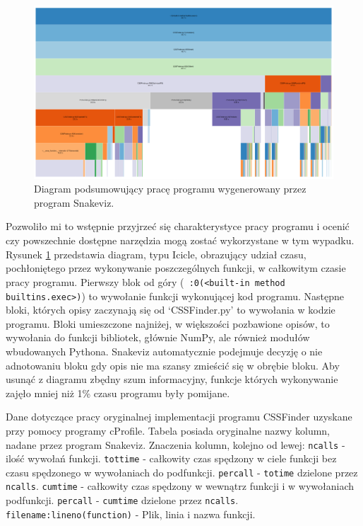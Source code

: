 \documentclass[11pt, a4paper]{article}
\newcommand{\code}[1]{\texttt{#1}}
\begin{document}
\begin{sloppypar}
    \FloatBarrier
    \begin{figure}[ht]
      \centering
      \includegraphics[width=1.0\textwidth]{"resources/profiling_1/graph.png"}
      \caption{Diagram podsumowujący pracę programu wygenerowany przez program Snakeviz.}
      \label{pre-prof-perf}
    \end{figure}
    \FloatBarrier

    Pozwoliło mi to wstępnie przyjrzeć się charakterystyce pracy programu i ocenić czy powszechnie
    dostępne narzędzia mogą zostać wykorzystane w tym wypadku. Rysunek
    \ref{pre-prof-perf} przedstawia diagram, typu Icicle, obrazujący udział czasu, pochłoniętego
    przez wykonywanie poszczególnych funkcji, w całkowitym czasie pracy programu. Pierwszy
    blok od góry (\code{~:0(<built-in method builtins.exec>)}) to wywołanie funkcji
    wykonującej kod programu. Następne bloki, których opisy zaczynają się od `CSSFinder.py'
    to wywołania w kodzie programu. Bloki umieszczone najniżej, w większości pozbawione
    opisów, to wywołania do funkcji bibliotek, głównie NumPy, ale również modułów wbudowanych
    Pythona. Snakeviz automatycznie podejmuje decyzję o nie adnotowaniu bloku gdy opis
    nie ma szansy zmieścić się w obrębie bloku. Aby usunąć z diagramu zbędny szum informacyjny,
    funkcje których wykonywanie zajęło mniej niż 1\% czasu programu były pomijane.

    \FloatBarrier
    \begin{table}[ht]
      \tiny
      \centering
      
      \caption{Dane dotyczące pracy oryginalnej implementacji programu CSSFinder uzyskane przy pomocy programy cProfile. Tabela posiada oryginalne nazwy kolumn, nadane przez program Snakeviz. Znaczenia kolumn, kolejno od lewej: \code{ncalls} - ilość wywołań funkcji. \code{tottime} - całkowity czas spędzony w ciele funkcji bez czasu spędzonego w wywołaniach do podfunkcji. \code{percall} - \code{totime} dzielone przez \code{ncalls}. \code{cumtime} - całkowity czas spędzony w wewnątrz funkcji i w wywołaniach podfunkcji. \code{percall} - \code{cumtime} dzielone przez \code{ncalls}. \code{filename:lineno(function)} - Plik, linia i nazwa funkcji.}
    \end{table}
    \FloatBarrier


\end{sloppypar}
\end{document}
